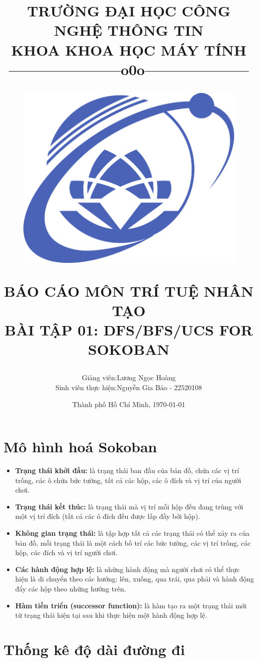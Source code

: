 \documentclass[12pt, letterpaper]{article}
\title{
	\large\textbf{TRƯỜNG ĐẠI HỌC CÔNG NGHỆ THÔNG TIN} \\
	\large\textbf{KHOA KHOA HỌC MÁY TÍNH} \\
	{---------------------o0o--------------------} \\
	\vfill
	\begin{figure}[h]
		\centering 
		\includegraphics[width=0.5\linewidth]{UIT} 
	\end{figure}
	\vfill
	\textbf{BÁO CÁO MÔN TRÍ TUỆ NHÂN TẠO}\\	
	\textbf{BÀI TẬP 01: DFS/BFS/UCS FOR SOKOBAN} \\
	\vskip 2cm
	\vfill
}
\author{
	\begin{tabular}{r l}
		Giảng viên: &{Lương Ngọc Hoàng} \\
		Sinh viên thực hiện:       &Nguyễn Gia Bảo - 22520108\\
	\end{tabular}
	\vspace{1cm}
}
\date{Thành phố Hồ Chí Minh, {\MakeLowercase{\today}}}
\begin{document}
	\maketitle
	\pagebreak
	\section{Mô hình hoá Sokoban}
	
	\begin{itemize}
		\item \textbf{Trạng thái khởi đầu:} là trạng thái ban đầu của bản đồ, chứa các vị trí trống, các ô chứa bức tường, tất cả các hộp, các ô đích và vị trí của người chơi.
		\item \textbf{Trạng thái kết thúc:} là trạng thái mà vị trí mỗi hộp đều đang 
		trùng với một vị trí đích (tất cả các ô đích đều được lấp đầy bởi hộp).
		\item \textbf{Không gian trạng thái:} là tập hợp tất cả các trạng thái có thể xảy ra của bản đồ, mỗi trạng thái là một cách bố trí các bức tường, các vị trí trống, các hộp, các đích và vị trí người chơi.
		\item \textbf{Các hành động hợp lệ:} là những hành động mà người chơi có thể thực 
		hiện là di chuyển theo các hướng: lên, xuống, qua trái, qua phải và hành động đẩy
		các hộp theo những hướng trên.
		\item \textbf{Hàm tiến triển (successor function):} là hàm tạo ra một trạng
		thái mới từ trạng thái hiện tại sau khi thực hiện một hành động hợp lệ.
	\end{itemize}
	
	\section{Thống kê độ dài đường đi}
	
\end{document}
